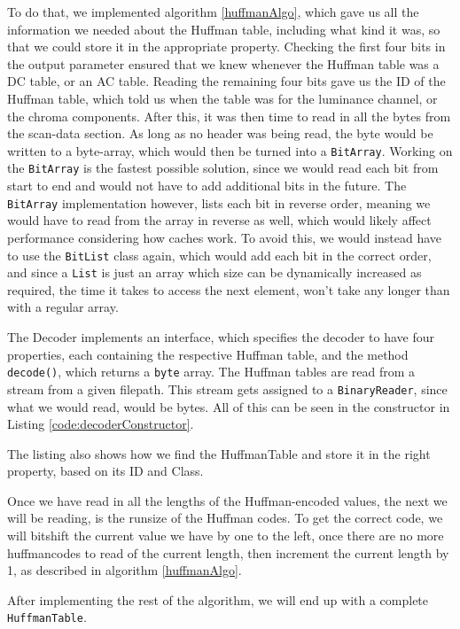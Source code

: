 To do that, we implemented algorithm \ref{huffmanAlgo}, which gave us all the information we needed about the Huffman table, including what kind it was, so that we could store it in the appropriate property. 
Checking the first four bits in the output parameter ensured that we knew whenever the Huffman table was a DC table, or an AC table. 
Reading the remaining four bits gave us the ID of the Huffman table, which told us when the table was for the luminance channel, or the chroma components.
After this, it was then time to read in all the bytes from the scan-data section. As long as no header was being read, the byte would be written to a byte-array, which would then be turned into a \lstinline|BitArray|.
Working on the \lstinline|BitArray| is the fastest possible solution, since we would read each bit from start to end and would not have to add additional bits in the future. The \lstinline|BitArray| implementation however, lists each bit in reverse order, meaning we would have to read from the array in reverse as well, which would likely affect performance considering how caches work.
To avoid this, we would instead have to use the \lstinline|BitList| class again, which would add each bit in the correct order, and since a \lstinline|List| is just an array which size can be dynamically increased as required, the time it takes to access the next element, won't take any longer than with a regular array. 

The Decoder implements an interface, which specifies the decoder to have four properties, each containing the respective Huffman table, and the method \lstinline|decode()|, which returns a \lstinline|byte| array. 
The Huffman tables are read from a stream from a given filepath. This stream gets assigned to a \lstinline|BinaryReader|, since what we would read, would be bytes. All of this can be seen in the constructor in Listing \ref{code:decoderConstructor}.
 

The listing also shows how we find the HuffmanTable and store it in the right property, based on its ID and Class.

Once we have read in all the lengths of the Huffman-encoded values, the next we will be reading, is the runsize of the Huffman codes. To get the correct code, we will bitshift the current value we have by one to the left, once there are no more huffmancodes to read of the current length, then increment the current length by 1, as described in algorithm \ref{huffmanAlgo}.

After implementing the rest of the algorithm, we will end up with a complete \lstinline|HuffmanTable|.
